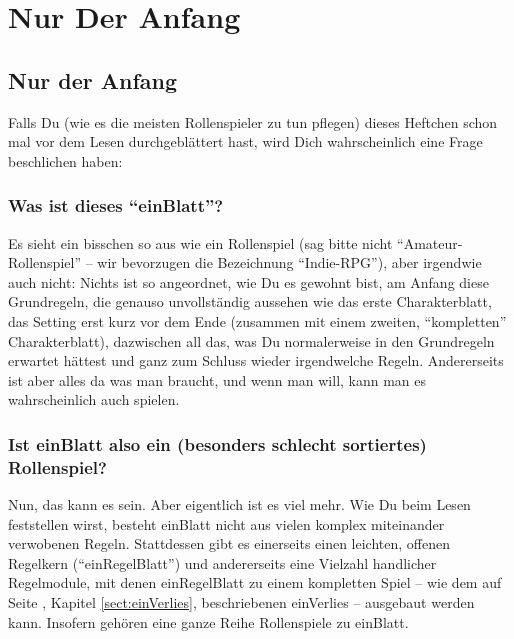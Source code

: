 \part {Nur Der Anfang}
\chapter {Nur der Anfang}

Falls Du (wie es die meisten Rollenspieler zu tun pflegen) dieses Heftchen schon mal vor dem Lesen durchgeblättert hast, wird Dich wahrscheinlich eine Frage beschlichen haben:

\section {Was ist dieses "`einBlatt"'?}
Es sieht ein bisschen so aus wie ein Rollenspiel (sag bitte nicht "`Amateur-Rollenspiel"' -- wir bevorzugen die Bezeichnung "`Indie-RPG"'), aber irgendwie auch nicht: Nichts ist so angeordnet, wie Du es gewohnt bist, am Anfang diese Grundregeln, die genauso unvollständig aussehen wie das erste Charakterblatt, das Setting erst kurz vor dem Ende (zusammen mit einem zweiten, "`kompletten"' Charakterblatt), dazwischen all das, was Du normalerweise in den Grundregeln erwartet hättest und ganz zum Schluss wieder irgendwelche Regeln. Andererseits ist aber alles da was man braucht, und wenn man will, kann man es wahrscheinlich auch spielen.

\section {Ist einBlatt also ein (besonders schlecht sortiertes) Rollenspiel?}
Nun, das kann es sein. Aber eigentlich ist es viel mehr. Wie Du beim Lesen feststellen wirst, besteht einBlatt nicht aus vielen komplex miteinander verwobenen Regeln. Stattdessen gibt es einerseits einen leichten, offenen Regelkern ("`einRegelBlatt"') und andererseits eine Vielzahl handlicher Regelmodule, mit denen einRegelBlatt zu einem kompletten Spiel -- wie dem  auf Seite \pageref {sect:einVerlies}, Kapitel \ref {sect:einVerlies}, beschriebenen einVerlies -- ausgebaut werden kann. Insofern gehören eine ganze Reihe Rollenspiele zu einBlatt. 

